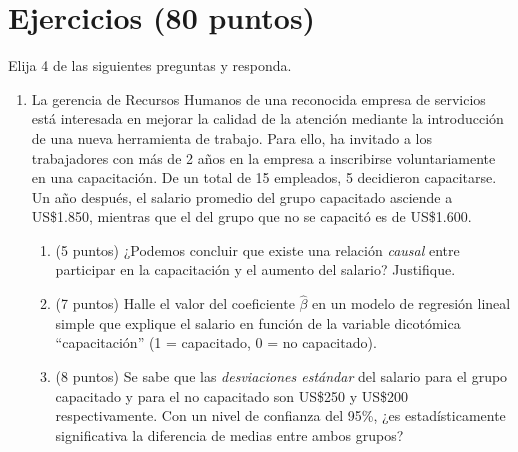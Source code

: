 \documentclass[10pt,a4paper]{article}
\begin{document}
\begin{enumerate}



\end{enumerate}

\section{Ejercicios (80 puntos)}
Elija 4 de las siguientes preguntas y responda. 
\begin{enumerate}
  \item La gerencia de Recursos Humanos de una reconocida empresa de servicios está interesada en mejorar la calidad de la atención mediante la introducción de una nueva herramienta de trabajo. Para ello, ha invitado a los trabajadores con más de 2 años en la empresa a inscribirse voluntariamente en una capacitación. De un total de 15 empleados, 5 decidieron capacitarse. Un año después, el salario promedio del grupo capacitado asciende a US\$1.850, mientras que el del grupo que no se capacitó es de US\$1.600.
\begin{enumerate}
      \item  (5 puntos) ¿Podemos concluir que existe una relación \textit{causal} entre participar en la capacitación y el aumento del salario? Justifique.

    \item  (7 puntos) Halle el valor del coeficiente $\hat{\beta}$ en un modelo de regresión lineal simple que explique el salario en función de la variable dicotómica ``capacitación'' (1 = capacitado, 0 = no capacitado).
    \item  (8 puntos) Se sabe que las \textit{desviaciones estándar} del salario para el grupo capacitado y para el no capacitado  son  US\$250  y  US\$200 respectivamente. Con un nivel de confianza del 95\%, ¿es estadísticamente significativa la diferencia de medias entre ambos grupos?
\end{enumerate}
    

\end{enumerate}
\end{document}

